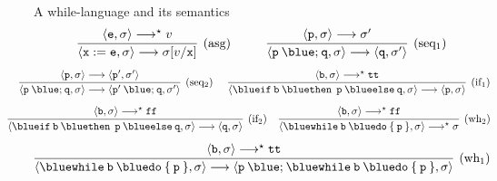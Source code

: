 \documentclass{beamer}
\begin{document}
\begin{frame}{A while-language and its semantics}
        \[
                \infer[(\text{asg})]{
                        \langle \mathtt{x := e}, \sigma \rangle \longrightarrow
                        \sigma[v / \mathtt{x}]
                }{
                       \langle \mathtt{e}, \sigma \rangle \longrightarrow^\star v
                } \hspace{1cm}
                \infer[(\text{seq$_1$})]{
                        \langle \mathtt{p \> {\blue ;} \> q}, \sigma \rangle \longrightarrow 
                        \pv{\prog{q}}{\sigma'}
                }{
                        \langle \mathtt{p}, \sigma \rangle \longrightarrow \sigma'
                }
        \]
        \vspace{0.001cm}
        \[
                \hspace{-0.5cm}
                \infer[(\text{seq$_2$})]{
                        \langle \mathtt{p \> {\blue ;} \> q}, \sigma \rangle \longrightarrow 
                        \pv{\prog{p' \> {\blue ;} \> q}}{\sigma'}
                }{
                        \langle \mathtt{p}, \sigma \rangle 
                        \longrightarrow \pv{\prog{p'}}{\sigma'}
                }
                \hspace{0.5cm}
                \infer[(\text{if$_1$})]{
                        \langle \mathtt{{\blue if} \> b \> {\blue then} \> \> 
                        p \> {\blue else} \> q}, 
                        \sigma \rangle \longrightarrow \pv{\prog{p}}{\sigma}
                }{
                        \langle \mathtt{b}, \sigma \rangle \longrightarrow^\star \mathtt{tt} 
                } 
        \]
        \vspace{0.001cm}
        \[      \hspace{-0.9cm}
                \infer[(\text{if$_2$})]{
                        \langle \mathtt{{\blue if} \> b \> {\blue then} \> \> 
                        p \> {\blue else} \> q}, 
                        \sigma \rangle \longrightarrow \pv{\prog{q}}{\sigma}
                }{
                        \langle \mathtt{b}, \sigma \rangle \longrightarrow^\star \mathtt{ff} 
                } 
                \hspace{0.4cm}
                \infer[(\text{wh$_2$})]{
                        \langle 
                        \mathtt{{\blue while} \> b \> {\blue do} \> \{ \> p \> \}}, \sigma \rangle
                        \longrightarrow^\star \sigma
                }{
                        \langle \mathtt{b}, \sigma \rangle \longrightarrow^\star \mathtt{ff}
                }
        \]\vspace{0.001cm}
        \[
                \infer[(\text{wh$_1$})]{
                        \langle \mathtt{{\blue while} \> b \> {\blue do} \> \{ \> p \> \}}, 
                        \sigma \rangle
                        \longrightarrow 
                        \pv{\prog{p} \> {\blue ;} \> 
                        \mathtt{{\blue while} \> b \> {\blue do} \> \{ \> p \> \}}}{
                        \sigma}
                }{
                        \pv{\prog{b}}{\sigma} \longrightarrow^\star \prog{tt} 
                }
        \]
\end{frame}
\end{document}
